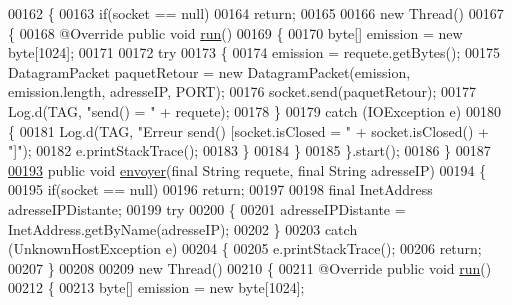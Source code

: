 \begin{DoxyCode}
00162     \{
00163         \textcolor{keywordflow}{if}(socket == null)
00164             \textcolor{keywordflow}{return};
00165 
00166         \textcolor{keyword}{new} Thread()
00167         \{
00168             @Override \textcolor{keyword}{public} \textcolor{keywordtype}{void} \hyperlink{classcom_1_1lasalle_1_1meeting_1_1_communication_afe29bde1b4538990bd0a8c9b2d512efa}{run}()
00169             \{
00170                 byte[] emission = \textcolor{keyword}{new} byte[1024];
00171 
00172                 \textcolor{keywordflow}{try}
00173                 \{
00174                     emission = requete.getBytes();
00175                     DatagramPacket paquetRetour = \textcolor{keyword}{new} DatagramPacket(emission, emission.length, adresseIP, 
      PORT);
00176                     socket.send(paquetRetour);
00177                     Log.d(TAG, \textcolor{stringliteral}{"send() = "} + requete);
00178                 \}
00179                 \textcolor{keywordflow}{catch} (IOException e)
00180                 \{
00181                     Log.d(TAG, \textcolor{stringliteral}{"Erreur send() [socket.isClosed = "} + socket.isClosed() + \textcolor{stringliteral}{"]"});
00182                     e.printStackTrace();
00183                 \}
00184             \}
00185         \}.start();
00186     \}
00187 
\hyperlink{classcom_1_1lasalle_1_1meeting_1_1_communication_a5dc5cc6c702a8d5da58c06afde637853}{00193}     \textcolor{keyword}{public} \textcolor{keywordtype}{void} \hyperlink{classcom_1_1lasalle_1_1meeting_1_1_communication_a5dc5cc6c702a8d5da58c06afde637853}{envoyer}(\textcolor{keyword}{final} String requete, \textcolor{keyword}{final} String adresseIP)
00194     \{
00195         \textcolor{keywordflow}{if}(socket == null)
00196             \textcolor{keywordflow}{return};
00197 
00198         \textcolor{keyword}{final} InetAddress adresseIPDistante;
00199         \textcolor{keywordflow}{try}
00200         \{
00201             adresseIPDistante = InetAddress.getByName(adresseIP);
00202         \}
00203         \textcolor{keywordflow}{catch} (UnknownHostException e)
00204         \{
00205             e.printStackTrace();
00206             \textcolor{keywordflow}{return};
00207         \}
00208 
00209         \textcolor{keyword}{new} Thread()
00210         \{
00211             @Override \textcolor{keyword}{public} \textcolor{keywordtype}{void} \hyperlink{classcom_1_1lasalle_1_1meeting_1_1_communication_afe29bde1b4538990bd0a8c9b2d512efa}{run}()
00212             \{
00213                 byte[] emission = \textcolor{keyword}{new} byte[1024];

\end{DoxyCode}
